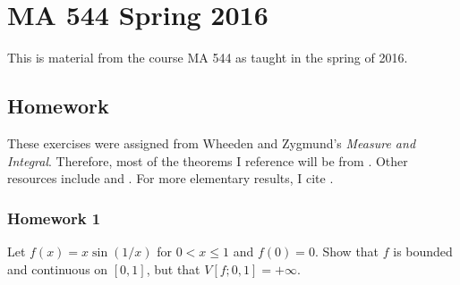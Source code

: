 \chapter{MA 544 Spring 2016}
\thispagestyle{empty}
This is material from the course MA 544 as taught in the spring of 2016.
\bigskip
\section{Homework}
These exercises were assigned from Wheeden and Zygmund's \emph{Measure and
  Integral}. Therefore, most of the theorems I reference will be from
\cite{wheeden-zygmund}. Other resources include \cite{folland} and
\cite{royden}. For more elementary results, I cite \cite{rudin-1}.
\subsection{Homework 1}
\begin{problem}
Let $f(x)=x\sin(1/x)$ for $0<x\leq 1$ and $f(0)=0$. Show that $f$ is
bounded and continuous on $[0,1]$, but that $V[f;0,1]=+\infty$.
\end{problem}
